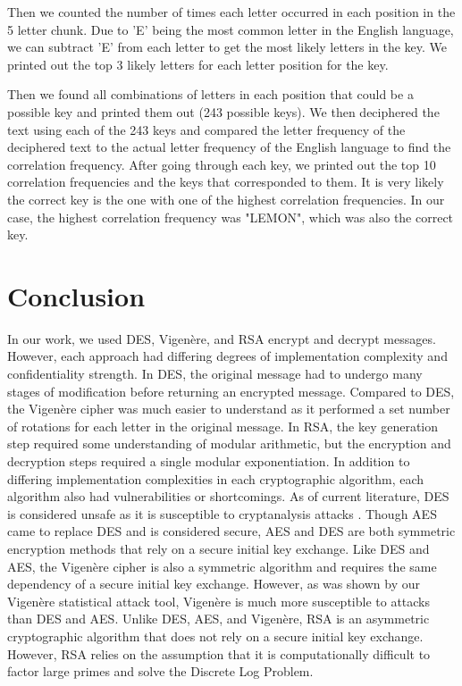 \documentclass[acmlarge]{acmart}
\begin{document}
Then we counted the number of times each letter occurred in each position in the 5 letter chunk. Due to 'E' being the most common letter in the English language, we can subtract 'E' from each letter to get the most likely letters in the key. We printed out the top 3 likely letters for each letter position for the key.

Then we found all combinations of letters in each position that could be a possible key and printed them out (243 possible keys). We then deciphered the text using each of the 243 keys and compared the letter frequency of the deciphered text to the actual letter frequency of the English language to find the correlation frequency. After going through each key, we printed out the top 10 correlation frequencies and the keys that corresponded to them. It is very likely the correct key is the one with one of the highest correlation frequencies. In our case, the highest correlation frequency was "LEMON", which was also the correct key.

\section{Conclusion}\label{sec:discussion}

In our work, we used DES, Vigen\`{e}re, and RSA encrypt and decrypt messages. However, each approach had differing degrees of implementation complexity and confidentiality strength. In DES, the original message had to undergo many stages of modification before returning an encrypted message. Compared to DES, the Vigen\`{e}re cipher was much easier to understand as it performed a set number of rotations for each letter in the original message. In RSA, the key generation step required some understanding of modular arithmetic, but the encryption and decryption steps required a single modular exponentiation. In addition to differing implementation complexities in each cryptographic algorithm, each algorithm also had vulnerabilities or shortcomings. As of current literature, DES is considered unsafe as it is susceptible to cryptanalysis attacks \cite{DESCryptanalysis}. Though AES came to replace DES and is considered secure, AES and DES are both symmetric encryption methods that rely on a secure initial key exchange. Like DES and AES, the Vigen\`{e}re cipher is also a symmetric algorithm and requires the same dependency of a secure initial key exchange. However, as was shown by our Vigen\`{e}re statistical attack tool, Vigen\`{e}re is much more susceptible to attacks than DES and AES. Unlike DES, AES, and Vigen\`{e}re, RSA is an asymmetric cryptographic algorithm that does not rely on a secure initial key exchange. However, RSA relies on the assumption that it is computationally difficult to factor large primes and solve the Discrete Log Problem. 



\end{document}
